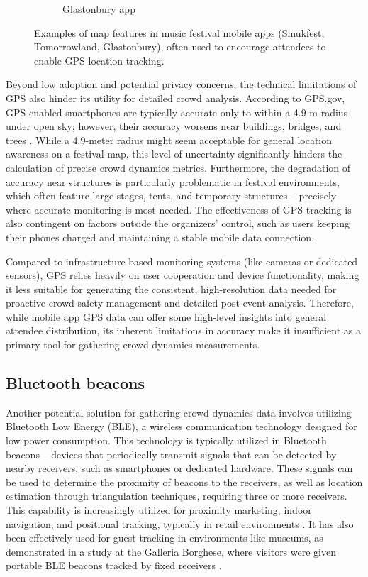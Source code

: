 \begin{figure}
\begin{subfigure}{.3\textwidth}
    \caption{Glastonbury app \cite{glastonbury_app}}
    \label{fig:glastonbury_app}
  \end{subfigure}
  \caption{Examples of map features in music festival mobile apps (Smukfest, Tomorrowland, Glastonbury), often used to encourage attendees to enable GPS location tracking.}
  \label{fig:festival_apps}
\end{figure}


Beyond low adoption and potential privacy concerns, the technical limitations of GPS also hinder its utility for detailed crowd analysis. According to GPS.gov, GPS-enabled smartphones are typically accurate only to within a 4.9 m radius under open sky; however, their accuracy worsens near buildings, bridges, and trees \cite{gps}. While a 4.9-meter radius might seem acceptable for general location awareness on a festival map, this level of uncertainty significantly hinders the calculation of precise crowd dynamics metrics. Furthermore, the degradation of accuracy near structures is particularly problematic in festival environments, which often feature large stages, tents, and temporary structures -- precisely where accurate monitoring is most needed. The effectiveness of GPS tracking is also contingent on factors outside the organizers' control, such as users keeping their phones charged and maintaining a stable mobile data connection.

Compared to infrastructure-based monitoring systems (like cameras or dedicated sensors), GPS relies heavily on user cooperation and device functionality, making it less suitable for generating the consistent, high-resolution data needed for proactive crowd safety management and detailed post-event analysis. Therefore, while mobile app GPS data can offer some high-level insights into general attendee distribution, its inherent limitations in accuracy make it insufficient as a primary tool for gathering crowd dynamics measurements.

\subsection{Bluetooth beacons}
Another potential solution for gathering crowd dynamics data involves utilizing Bluetooth Low Energy (BLE), a wireless communication technology designed for low power consumption. This technology is typically utilized in Bluetooth beacons -- devices that periodically transmit signals that can be detected by nearby receivers, such as smartphones or dedicated hardware. These signals can be used to determine the proximity of beacons to the receivers, as well as location estimation through triangulation techniques, requiring three or more receivers. This capability is increasingly utilized for proximity marketing, indoor navigation, and positional tracking, typically in retail environments \cite{bt_beacon}. It has also been effectively used for guest tracking in environments like museums, as demonstrated in a study at the Galleria Borghese, where visitors were given portable BLE beacons tracked by fixed receivers \cite{borghese}.

